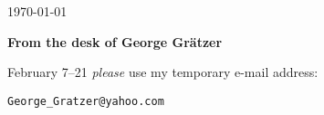 \documentclass{sample}
\begin{document}
\begin{flushright}
    \today
\end{flushright}

\textbf{From the desk of George Gr\"{a}tzer}

February 7--21 \emph{please} use my temporary e-mail address:
\begin{center}
    \texttt{George\_Gratzer@yahoo.com}
\end{center}
\end{document}
